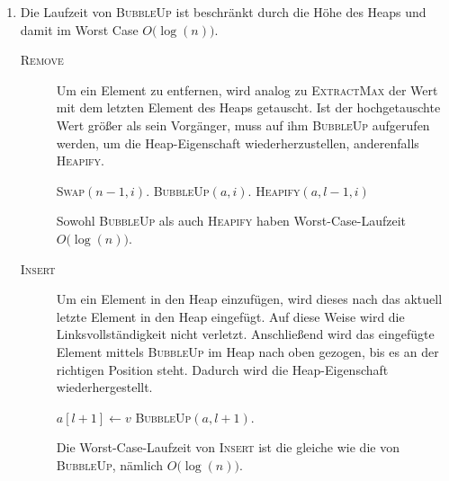 \documentclass[11pt,a4paper]{article}
\begin{document}
\begin{loesung}
\begin{enumerate}
        \item 
        Die Laufzeit von \textsc{BubbleUp} ist beschränkt durch die Höhe des Heaps und damit im Worst Case $O\big(\log(n)\big)$.
        \begin{description}
            \item[\textsc{Remove}] 
            Um ein Element zu entfernen, wird analog zu \textsc{ExtractMax} der Wert mit dem letzten Element des Heaps getauscht.
            Ist der \glqq{}hochgetauschte\grqq{} Wert größer als sein Vorgänger, muss auf ihm \textsc{BubbleUp} aufgerufen werden, um die Heap-Eigenschaft wiederherzustellen, anderenfalls \textsc{Heapify}.
            \begin{samepage}
            \begin{algorithmic}[1]
                    \State \textsc{Swap}$(n - 1, i)$.
                    \State \textsc{BubbleUp}$(a, i)$.
                    \State \textsc{Heapify}$(a, l - 1, i)$
                \EndProcedure
            \end{algorithmic}
            \end{samepage}
            Sowohl \textsc{BubbleUp} als auch \textsc{Heapify} haben Worst-Case-Laufzeit $O\big(\log(n)\big)$.

            \item[\textsc{Insert}]
            Um ein Element in den Heap einzufügen, wird dieses nach das aktuell letzte Element in den Heap eingefügt.
            Auf diese Weise wird die Linksvollständigkeit nicht verletzt.
            Anschließend wird das eingefügte Element mittels \textsc{BubbleUp} im Heap nach oben \glqq{}gezogen\grqq{}, bis es an der richtigen Position steht. Dadurch wird die Heap-Eigenschaft wiederhergestellt.
            \begin{samepage}
            \begin{algorithmic}[1]
                    \State $a[l + 1] \gets v$
                    \State \textsc{BubbleUp}$(a, l + 1)$.
                \EndProcedure
            \end{algorithmic}
            \end{samepage}
            Die Worst-Case-Laufzeit von \textsc{Insert} ist die gleiche wie die von \textsc{BubbleUp}, nämlich $O\big(\log(n)\big)$.
        \end{description}


\end{enumerate}
\end{loesung}
\end{document}
